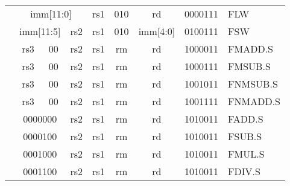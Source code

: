 \begin{table}[p]
\begin{small}
\begin{center}
\begin{tabular}{p{0in}p{0.4in}p{0.05in}p{0.05in}p{0.05in}p{0.05in}p{0.4in}p{0.6in}p{0.4in}p{0.6in}p{0.7in}l}
&
\multicolumn{6}{|c|}{imm[11:0]} &
\multicolumn{1}{c|}{rs1} &
\multicolumn{1}{c|}{010} &
\multicolumn{1}{c|}{rd} &
\multicolumn{1}{c|}{0000111} & FLW \\
\cline{2-11}


&
\multicolumn{4}{|c|}{imm[11:5]} &
\multicolumn{2}{c|}{rs2} &
\multicolumn{1}{c|}{rs1} &
\multicolumn{1}{c|}{010} &
\multicolumn{1}{c|}{imm[4:0]} &
\multicolumn{1}{c|}{0100111} & FSW \\
\cline{2-11}


&
\multicolumn{2}{|c|}{rs3} &
\multicolumn{2}{c|}{00} &
\multicolumn{2}{c|}{rs2} &
\multicolumn{1}{c|}{rs1} &
\multicolumn{1}{c|}{rm} &
\multicolumn{1}{c|}{rd} &
\multicolumn{1}{c|}{1000011} & FMADD.S \\
\cline{2-11}


&
\multicolumn{2}{|c|}{rs3} &
\multicolumn{2}{c|}{00} &
\multicolumn{2}{c|}{rs2} &
\multicolumn{1}{c|}{rs1} &
\multicolumn{1}{c|}{rm} &
\multicolumn{1}{c|}{rd} &
\multicolumn{1}{c|}{1000111} & FMSUB.S \\
\cline{2-11}


&
\multicolumn{2}{|c|}{rs3} &
\multicolumn{2}{c|}{00} &
\multicolumn{2}{c|}{rs2} &
\multicolumn{1}{c|}{rs1} &
\multicolumn{1}{c|}{rm} &
\multicolumn{1}{c|}{rd} &
\multicolumn{1}{c|}{1001011} & FNMSUB.S \\
\cline{2-11}


&
\multicolumn{2}{|c|}{rs3} &
\multicolumn{2}{c|}{00} &
\multicolumn{2}{c|}{rs2} &
\multicolumn{1}{c|}{rs1} &
\multicolumn{1}{c|}{rm} &
\multicolumn{1}{c|}{rd} &
\multicolumn{1}{c|}{1001111} & FNMADD.S \\
\cline{2-11}


&
\multicolumn{4}{|c|}{0000000} &
\multicolumn{2}{c|}{rs2} &
\multicolumn{1}{c|}{rs1} &
\multicolumn{1}{c|}{rm} &
\multicolumn{1}{c|}{rd} &
\multicolumn{1}{c|}{1010011} & FADD.S \\
\cline{2-11}


&
\multicolumn{4}{|c|}{0000100} &
\multicolumn{2}{c|}{rs2} &
\multicolumn{1}{c|}{rs1} &
\multicolumn{1}{c|}{rm} &
\multicolumn{1}{c|}{rd} &
\multicolumn{1}{c|}{1010011} & FSUB.S \\
\cline{2-11}


&
\multicolumn{4}{|c|}{0001000} &
\multicolumn{2}{c|}{rs2} &
\multicolumn{1}{c|}{rs1} &
\multicolumn{1}{c|}{rm} &
\multicolumn{1}{c|}{rd} &
\multicolumn{1}{c|}{1010011} & FMUL.S \\
\cline{2-11}


&
\multicolumn{4}{|c|}{0001100} &
\multicolumn{2}{c|}{rs2} &
\multicolumn{1}{c|}{rs1} &
\multicolumn{1}{c|}{rm} &
\multicolumn{1}{c|}{rd} &
\multicolumn{1}{c|}{1010011} & FDIV.S \\
\cline{2-11}



\end{tabular}
\end{center}
\end{small}
\end{table}
